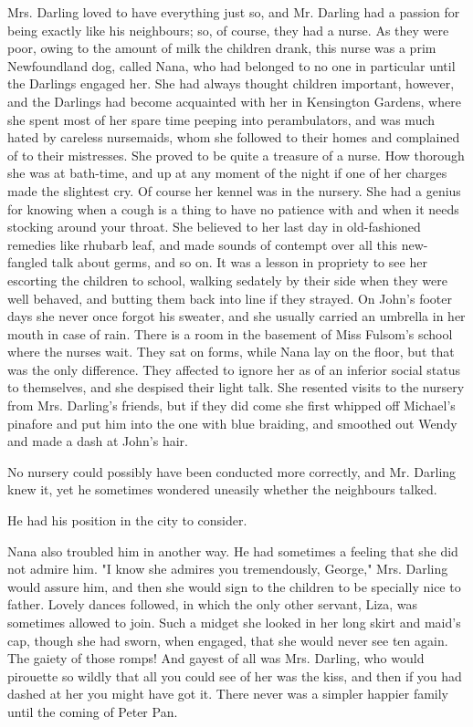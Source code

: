 Mrs. Darling loved to have everything just so, and Mr. Darling had a
passion for being exactly like his neighbours; so, of course, they had a
nurse. As they were poor, owing to the amount of milk the children drank,
this nurse was a prim Newfoundland dog, called Nana, who had belonged to
no one in particular until the Darlings engaged her. She had always
thought children important, however, and the Darlings had become
acquainted with her in Kensington Gardens, where she spent most of her
spare time peeping into perambulators, and was much hated by careless
nursemaids, whom she followed to their homes and complained of to their
mistresses. She proved to be quite a treasure of a nurse. How thorough she
was at bath-time, and up at any moment of the night if one of her charges
made the slightest cry. Of course her kennel was in the nursery. She had a
genius for knowing when a cough is a thing to have no patience with and
when it needs stocking around your throat. She believed to her last day in
old-fashioned remedies like rhubarb leaf, and made sounds of contempt over
all this new-fangled talk about germs, and so on. It was a lesson in
propriety to see her escorting the children to school, walking sedately by
their side when they were well behaved, and butting them back into line if
they strayed. On John's footer days she never once forgot his sweater, and she
usually carried an umbrella in her mouth in case of rain. There is a room
in the basement of Miss Fulsom's school where the nurses wait. They sat on
forms, while Nana lay on the floor, but that was the only difference. They
affected to ignore her as of an inferior social status to themselves, and
she despised their light talk. She resented visits to the nursery from
Mrs. Darling's friends, but if they did come she first whipped off
Michael's pinafore and put him into the one with blue braiding, and
smoothed out Wendy and made a dash at John's hair.


No nursery could possibly have been conducted more correctly, and Mr.
Darling knew it, yet he sometimes wondered uneasily whether the neighbours
talked.


He had his position in the city to consider.


Nana also troubled him in another way. He had sometimes a feeling that she
did not admire him. "I know she admires you tremendously, George," Mrs.
Darling would assure him, and then she would sign to the children to be
specially nice to father. Lovely dances followed, in which the only other
servant, Liza, was sometimes allowed to join. Such a midget she looked in
her long skirt and maid's cap, though she had sworn, when engaged, that
she would never see ten again. The gaiety of those romps! And gayest of
all was Mrs. Darling, who would pirouette so wildly that all you could see
of her was the kiss, and then if you had dashed at her you might have got
it. There never was a simpler happier family until the coming of Peter
Pan.



